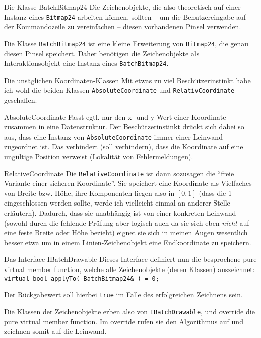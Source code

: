 \begin{frame}[fragile]{Die Klasse BatchBitmap24}
	Die Zeichenobjekte, die also theoretisch auf einer Instanz eines \verb|Bitmap24| arbeiten können, sollten -- um die Benutzereingabe auf der Kommandozeile zu vereinfachen -- diesen vorhandenen Pinsel verwenden.
	
	\pause
	\vspace{1em}
	
	Die Klasse \verb|BatchBitmap24| ist eine kleine Erweiterung von \verb|Bitmap24|, die genau diesen Pinsel speichert. Daher benötigen die Zeichenobjekte als Interaktionsobjekt eine Instanz eines \verb|BatchBitmap24|.
\end{frame}

\begin{frame}[fragile]{Die unsäglichen Koordinaten-Klassen}
	Mit etwas zu viel Beschützerinstinkt habe ich wohl die beiden Klassen \verb|AbsoluteCoordinate| und \verb|RelativCoordinate| geschaffen.
	
	\pause
	\footnotesize
	
	\begin{block}{AbsoluteCoordinate}
		Fasst egtl. nur den x- und y-Wert einer Koordinate zusammen in eine Datenstruktur. Der Beschützerinstinkt drückt sich dabei so aus, dass eine Instanz von \verb|AbsoluteCoordinate| immer einer Leinwand zugeordnet ist. Das verhindert (soll verhindern), dass die Koordinate auf eine ungültige Position verweist (Lokalität von Fehlermeldungen).
	\end{block}
	
	\pause
	
	\begin{block}{RelativeCoordinate}
		Die \verb|RelativeCoordinate| ist dann sozusagen die \enquote{freie Variante einer sicheren Koordinate}. Sie speichert eine Koordinate als Vielfaches von Breite bzw. Höhe, ihre Komponenten liegen also in $[0, 1]$ (dass die 1 eingeschlossen werden sollte, werde ich vielleicht einmal an anderer Stelle erläutern).
		Dadurch, dass sie unabhängig ist von einer konkreten Leinwand (sowohl durch die fehlende Prüfung aber logisch auch da sie sich eben \emph{nicht} auf eine feste Breite oder Höhe bezieht) eignet sie sich in meinen Augen wesentlich besser etwa um in einem Linien-Zeichenobjekt eine Endkoordinate zu speichern.
	\end{block}
\end{frame}

\begin{frame}[fragile]{Das Interface IBatchDrawable}
	Dieses Interface definiert nun die besprochene pure virtual member function, welche alle Zeichenobjekte (deren Klassen) auszeichnet: \verb|virtual bool applyTo( BatchBitmap24& ) = 0;|
	
	Der Rückgabewert soll hierbei \verb|true| im Falle des erfolgreichen Zeichnens sein.
	
	\pause
	\vspace{1em}
	
	Die Klassen der Zeichenobjekte erben also von \verb|IBatchDrawable|, und override die pure virtual member function. Im override rufen sie den Algorithmus auf und zeichnen somit auf die Leinwand.
\end{frame}

